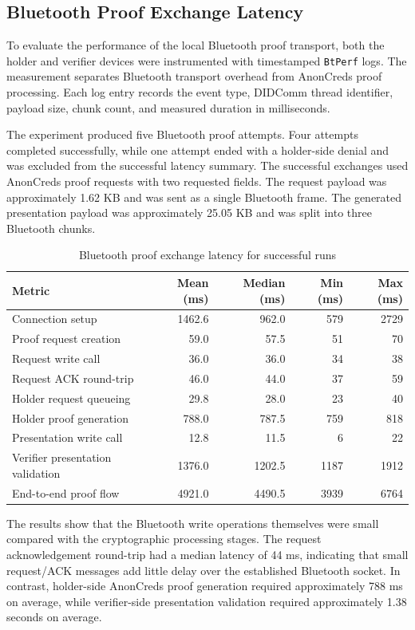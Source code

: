 \subsection{Bluetooth Proof Exchange Latency}

To evaluate the performance of the local Bluetooth proof transport, both the holder and verifier devices were instrumented with timestamped \texttt{BtPerf} logs. The measurement separates Bluetooth transport overhead from AnonCreds proof processing. Each log entry records the event type, DIDComm thread identifier, payload size, chunk count, and measured duration in milliseconds.

The experiment produced five Bluetooth proof attempts. Four attempts completed successfully, while one attempt ended with a holder-side denial and was excluded from the successful latency summary. The successful exchanges used AnonCreds proof requests with two requested fields. The request payload was approximately 1.62 KB and was sent as a single Bluetooth frame. The generated presentation payload was approximately 25.05 KB and was split into three Bluetooth chunks.

\begin{table}[h]
\centering
\caption{Bluetooth proof exchange latency for successful runs}
\label{tab:bluetooth-proof-latency}
\begin{tabular}{lrrrr}
\hline
Metric & Mean (ms) & Median (ms) & Min (ms) & Max (ms) \\
\hline
Connection setup & 1462.6 & 962.0 & 579 & 2729 \\
Proof request creation & 59.0 & 57.5 & 51 & 70 \\
Request write call & 36.0 & 36.0 & 34 & 38 \\
Request ACK round-trip & 46.0 & 44.0 & 37 & 59 \\
Holder request queueing & 29.8 & 28.0 & 23 & 40 \\
Holder proof generation & 788.0 & 787.5 & 759 & 818 \\
Presentation write call & 12.8 & 11.5 & 6 & 22 \\
Verifier presentation validation & 1376.0 & 1202.5 & 1187 & 1912 \\
End-to-end proof flow & 4921.0 & 4490.5 & 3939 & 6764 \\
\hline
\end{tabular}
\end{table}

The results show that the Bluetooth write operations themselves were small compared with the cryptographic processing stages. The request acknowledgement round-trip had a median latency of 44 ms, indicating that small request/ACK messages add little delay over the established Bluetooth socket. In contrast, holder-side AnonCreds proof generation required approximately 788 ms on average, while verifier-side presentation validation required approximately 1.38 seconds on average.


